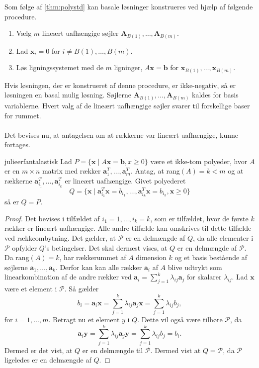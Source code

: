 \noindent
Som følge af \ref{thm:polystd} kan basale løsninger konstrueres ved hjælp af følgende procedure.
\begin{enumerate}
\item Vælg $m$ lineært uafhængige søjler $\textbf{A}_{B(1)},\ldots,\textbf{A}_{B(m)}.$
\item Lad $\textbf{x}_i=0$ for $i \neq B(1),\ldots,B(m).$
\item Løs ligningssystemet med de $m$ ligninger, $A\textbf{x}=\textbf{b}$ for $\textbf{x}_{B(1)}, \ldots , \textbf{x}_{B(m)}.$
\end{enumerate}
Hvis løsningen, der er konstrueret af denne procedure, er ikke-negativ, så er løsningen en basal mulig løsning. Søjlerne $\textbf{A}_{B(1)},\ldots,\textbf{A}_{B(m)}$ kaldes for basis variablerne. Hvert valg af de lineært uafhængige søjler svarer til forskellige baser for rummet.
\\\\
\noindent
Det bevises nu, at antagelsen om at rækkerne var lineært uafhængige, kunne fortages.
\begin{thm}{}{julieerfantalastisk}
Lad $P=\{\textbf{x} \mid  A\textbf{x}=\textbf{b},x \geq 0\}$ være et ikke-tom polyeder, hvor $A$ er en $m \times n$ matrix med rækker $\textbf{a}^{T}_{1},\ldots,\textbf{a}^{T}_{m}$.
Antag, at rang$(A)=k<m$ og at rækkerne $\textbf{a}^T_{i_1},\ldots,\textbf{a}^T_{i_k}$ er lineært uafhængige. Givet polyederet 
$$Q=\{\textbf{x} \mid \textbf{a}^T_{i_1}\textbf{x}=b_{i_1},\ldots,\textbf{a}^T_{i_k}\textbf{x}=b_{i_k}, \textbf{x} \geq 0  \}$$ 
så er $Q=P$.
\end{thm}
\begin{proof}
Det bevises i tilfældet af $i_1=1,\ldots,i_k=k$, som er tilfældet, hvor de første $k$ rækker er lineært uafhængige. 
Alle andre tilfælde kan omskrives til dette tilfælde ved rækkeombytning. 
Det gælder, at $\mathcal{P}$ er en delmængde af $Q$, da alle elementer i $\mathcal{P}$ opfylder $Q$'s betingelser. 
Det skal dernæst vises, at $Q$ er en delmængde af $\mathcal{P}$.
Da rang$(A)=k$, har rækkerummet af $A$ dimension $k$ og et basis bestående af søjlerne $\textbf{a}_1,\ldots,\textbf{a}_k$. 
Derfor kan kan alle rækker $\textbf{a}_i$ af $A$ blive udtrykt som linearkombination af de andre rækker ved $\textbf{a}_i=\sum^{k}_{j=1}\lambda_{ij}\textbf{a}_j$ for skalarer $\lambda_{ij}$. 
Lad $\textbf{x}$ være et element i $\mathcal{P}$. 
Så gælder
$$b_i=\textbf{a}_i\textbf{x}=\sum^{k}_{j=1}\lambda_{ij}\textbf{a}_j\textbf{x}=\sum^{k}_{j=1}\lambda_{ij}b_j,$$
for $i=1,\ldots,m.$
Betragt nu et element $y$ i $Q$. 
Dette vil også være tilhøre $\mathcal{P}$, da
$$ \textbf{a}_i\textbf{y}=\sum^{k}_{j=1}\lambda_{ij}\textbf{a}_j\textbf{y}=\sum^{k}_{j=1}\lambda_{ij}b_j=b_i.$$
Dermed er det vist, at $Q$ er en delmængde til $\mathcal{P}$. 
Dermed vist at $Q=\mathcal{P}$, da $\mathcal{P}$ ligeledes er en delmængde af $Q$.
\end{proof} \\